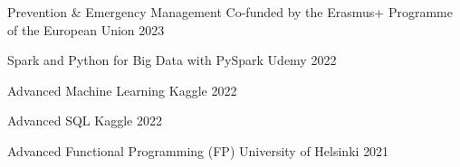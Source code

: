 

\begin{cvhonors}

  \cvhonor
    {Prevention \& Emergency Management} %
    {Co-funded by the Erasmus+ Programme of the European Union}
    {
    } %
    {2023} %

  \cvhonor
    {Spark and Python for Big Data with PySpark} %
    {Udemy} %
    {} %
    {2022} %

  \cvhonor
    {Advanced Machine Learning} %
    {Kaggle} %
    {} %
    {2022} %

  \cvhonor
    {Advanced SQL} %
    {Kaggle} %
    {} %
    {2022} %

  \cvhonor
    {Advanced Functional Programming (FP)} %
    {University of Helsinki} %
    {} %
    {2021} %

\end{cvhonors}
